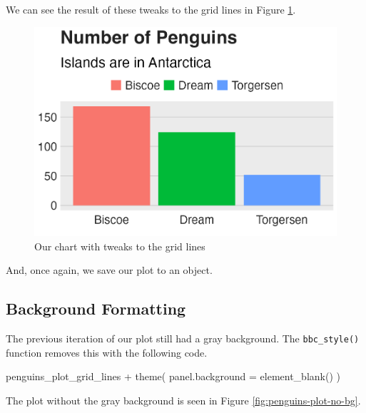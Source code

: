 \documentclass[
]{book}
\newenvironment{Shaded}{\begin{snugshade}}{\end{snugshade}}
\newcommand{\AttributeTok}[1]{\textcolor[rgb]{0.77,0.63,0.00}{#1}}
\newcommand{\FunctionTok}[1]{\textcolor[rgb]{0.00,0.00,0.00}{#1}}
\newcommand{\NormalTok}[1]{#1}
\newcommand{\SpecialCharTok}[1]{\textcolor[rgb]{0.00,0.00,0.00}{#1}}
\begin{document}
We can see the result of these tweaks to the grid lines in Figure \ref{fig:penguins-plot-gridlines-plot}.

\begin{figure}
\includegraphics[width=1\linewidth]{custom-theme_files/figure-latex/penguins-plot-gridlines-plot-1} \caption{Our chart with tweaks to the grid lines}\label{fig:penguins-plot-gridlines-plot}
\end{figure}

And, once again, we save our plot to an object.

\hypertarget{background-formatting}{%
\subsection*{Background Formatting}\label{background-formatting}}

The previous iteration of our plot still had a gray background. The \texttt{bbc\_style()} function removes this with the following code.

\begin{Shaded}
\begin{Highlighting}[]
\NormalTok{penguins\_plot\_grid\_lines }\SpecialCharTok{+}
  \FunctionTok{theme}\NormalTok{(}
    \AttributeTok{panel.background =} \FunctionTok{element\_blank}\NormalTok{()}
\NormalTok{  )}
\end{Highlighting}
\end{Shaded}

The plot without the gray background is seen in Figure \ref{fig:penguins-plot-no-bg}.
\end{document}
